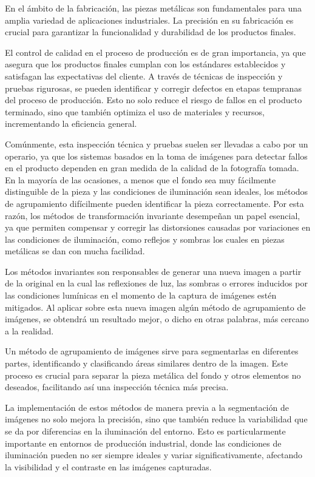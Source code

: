 
En el ámbito de la fabricación, las piezas metálicas son fundamentales para una amplia variedad de aplicaciones industriales. La precisión en su fabricación es crucial para garantizar la funcionalidad y durabilidad de los productos finales. 

El control de calidad en el proceso de producción es de gran importancia, ya que asegura que los productos finales cumplan con los estándares establecidos y satisfagan las expectativas del cliente. A través de técnicas de inspección y pruebas rigurosas, se pueden identificar y corregir defectos en etapas tempranas del proceso de producción. Esto no solo reduce el riesgo de fallos en el producto terminado, sino que también optimiza el uso de materiales y recursos, incrementando la eficiencia general.

Comúnmente, esta inspección técnica y pruebas suelen ser llevadas a cabo por un operario, ya que los sistemas basados en la toma de imágenes para detectar fallos en el producto dependen en gran medida de la calidad de la fotografía tomada. En la mayoría de las ocasiones, a menos que el fondo sea muy fácilmente distinguible de la pieza y las condiciones de iluminación sean ideales, los métodos de agrupamiento difícilmente pueden identificar la pieza correctamente. Por esta razón, los métodos de transformación invariante desempeñan un papel esencial, ya que permiten compensar y corregir las distorsiones causadas por variaciones en las condiciones de iluminación, como reflejos y sombras los cuales en piezas metálicas se dan con mucha facilidad.

Los métodos invariantes son responsables de generar una nueva imagen a partir de la original en la cual las reflexiones de luz, las sombras o errores inducidos por las condiciones lumínicas en el momento de la captura de imágenes estén mitigados. Al aplicar sobre esta nueva imagen algún método de agrupamiento de imágenes, se obtendrá un resultado mejor, o dicho en otras palabras, más cercano a la realidad.

Un método de agrupamiento de imágenes sirve para segmentarlas en diferentes partes, identificando y clasificando áreas similares dentro de la imagen. Este proceso es crucial para separar la pieza metálica del fondo y otros elementos no deseados, facilitando así una inspección técnica más precisa.

La implementación de estos métodos de manera previa a la segmentación de imágenes no solo mejora la precisión, sino que también reduce la variabilidad que se da por diferencias en la iluminación del entorno. Esto es particularmente importante en entornos de producción industrial, donde las condiciones de iluminación pueden no ser siempre ideales y variar significativamente, afectando la visibilidad y el contraste en las imágenes capturadas.

